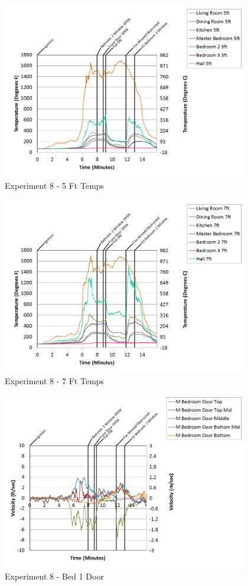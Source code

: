 \documentclass{article}
\begin{document}
\begin{appendices}
\begin{figure}[h!]
	\centering
	\includegraphics[height=3.05in]{0_Images/Results_Charts/Exp_8_Charts/5FtTemps.png}
	\caption{Experiment 8 - 5 Ft Temps}
\end{figure}


\begin{figure}[h!]
	\centering
	\includegraphics[height=3.05in]{0_Images/Results_Charts/Exp_8_Charts/7FtTemps.png}
	\caption{Experiment 8 - 7 Ft Temps}
\end{figure}

\clearpage

\begin{figure}[h!]
	\centering
	\includegraphics[height=3.05in]{0_Images/Results_Charts/Exp_8_Charts/Bed1Door.png}
	\caption{Experiment 8 - Bed 1 Door}
\end{figure}



\end{appendices}
\end{document}
